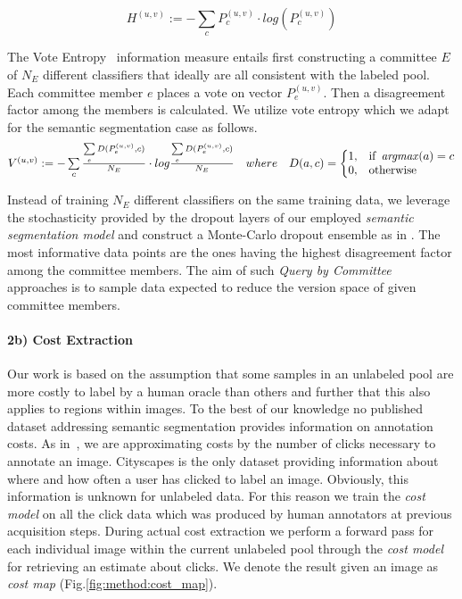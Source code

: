 \documentclass{bmvc2k}
\newcommand{\argmax}{\mathop{\mathit{argmax}}\limits}
\begin{document}
\begin{equation}
  \label{eq2}
  H^{(u,v)} := -\sum\limits_{c} P_c^{(u,v)} \cdot log(P_c^{(u,v)}) 
\end{equation}

The Vote Entropy~\cite{DBLP:conf/icml/DaganE95} information measure entails first constructing a committee $E$ of $N_E$ different classifiers that ideally are all consistent with the labeled pool. Each committee member $e$ places a vote on vector $P_e^{{(u,v)}}$. Then a disagreement factor among the members is calculated. We utilize vote entropy which we adapt for the semantic segmentation case as follows. 
\vspace{-0.5cm}\begin{equation}
\mbox{\fontsize{10}{10}\selectfont\( %
  \label{eq3}
  {V}^{(u,v)} := -\sum\limits_{c} \frac{\sum\limits_{e} D(P_{e}^{{(u,v)}},c)}{N_E} \cdot log \frac{\sum\limits_{e} D(P_{e}^{{(u,v)}},c)}{N_E}
  \quad where \quad
  D(a,c)=
\begin{cases}
    1, & \text{if } \argmax(a)=c\\
    0, & \text{otherwise}
\end{cases}
\)} %
\end{equation}

Instead of training $N_E$ different classifiers on the same training data, we leverage the stochasticity provided by the dropout layers of our employed \textit{semantic segmentation model} and construct a Monte-Carlo dropout ensemble as in \cite{DBLP:conf/icml/GalG16}. The most informative data points are the ones having the highest disagreement factor among the committee members. The aim of such \textit{Query by Committee}~\cite{DBLP:conf/nips/FreundSST92} approaches is to sample data expected to reduce the version space of given committee members. 

\vspace{-0.275cm}\paragraph{2b) Cost Extraction}
Our work is based on the assumption that some samples in an unlabeled pool are more costly to label by a human oracle than others and further that this also applies to regions within images. To the best of our knowledge no published dataset addressing semantic segmentation provides information on annotation costs. As in~\cite{DBLP:conf/cvpr/FengPCC16,DBLP:conf/cvpr/XuPCYH16}, we are approximating costs by the number of clicks necessary to annotate an image. Cityscapes is the only dataset providing information about where and how often a user has clicked to label an image. Obviously, this information is unknown for unlabeled data. For this reason we train the \textit{cost model} on all the click data which was produced by human annotators at previous acquisition steps. During actual cost extraction we perform a forward pass for each individual image within the current unlabeled pool through the \textit{cost model} for retrieving an estimate about clicks. We denote the result given an image as {\it cost map} (Fig.\ref{fig:method:cost_map}).
\end{document}
